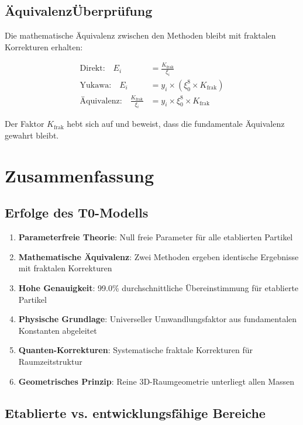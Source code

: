 \documentclass[12pt,a4paper]{article}
\begin{document}
\subsection{\"A{}quivalenz\"U{}berpr\"u{}fung}
\label{subsec:equivalence_verification}

Die mathematische \"A{}quivalenz zwischen den Methoden bleibt mit fraktalen Korrekturen erhalten:

\begin{align}
	\text{Direkt:} \quad E_i &= \frac{K_{\text{frak}}}{\xi_i} \\
	\text{Yukawa:} \quad E_i &= y_i \times (\xi_0^8 \times K_{\text{frak}}) \\
	\text{\"A{}quivalenz:} \quad \frac{K_{\text{frak}}}{\xi_i} &= y_i \times \xi_0^8 \times K_{\text{frak}}
\end{align}

Der Faktor $K_{\text{frak}}$ hebt sich auf und beweist, dass die fundamentale \"A{}quivalenz gewahrt bleibt.

\section{Zusammenfassung}
\label{sec:summary}

\subsection{Erfolge des T0-Modells}
\label{subsec:achievements}

\begin{enumerate}
	\item \textbf{Parameterfreie Theorie}: Null freie Parameter f\"ur alle etablierten Partikel
	\item \textbf{Mathematische \"A{}quivalenz}: Zwei Methoden ergeben identische Ergebnisse mit fraktalen Korrekturen
	\item \textbf{Hohe Genauigkeit}: 99.0\% durchschnittliche \"U{}bereinstimmung f\"ur etablierte Partikel
	\item \textbf{Physische Grundlage}: Universeller Umwandlungsfaktor aus fundamentalen Konstanten abgeleitet
	\item \textbf{Quanten-Korrekturen}: Systematische fraktale Korrekturen f\"ur Raumzeitstruktur
	\item \textbf{Geometrisches Prinzip}: Reine 3D-Raumgeometrie unterliegt allen Massen
\end{enumerate}

\subsection{Etablierte vs. entwicklungsf\"a{}hige Bereiche}
\label{subsec:established_vs_developing}
\end{document}
